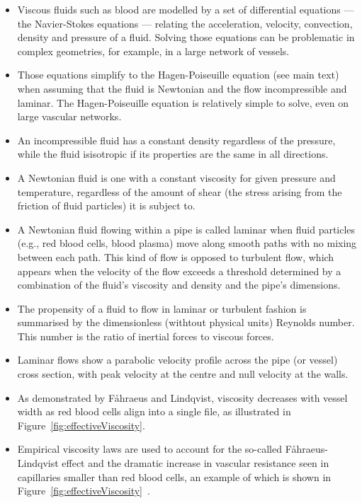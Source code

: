 \documentclass{article}
\begin{document}
\begin{tcolorbox}[title=Additional information -- Fluid flow modelling]
  \begin{itemize}
  \item Viscous fluids such as blood are modelled by a set of differential equations --- the Navier-Stokes equations --- relating the acceleration, velocity, convection, density and pressure of a fluid.
    Solving those equations can be problematic in complex geometries, for example, in a large network of vessels.
  \item Those equations simplify to the Hagen-Poiseuille equation (see main text) when assuming that the fluid is Newtonian and the flow incompressible and laminar.
    The Hagen-Poiseuille equation is relatively simple to solve, even on large vascular networks.
  \item An incompressible fluid has a constant density regardless of the pressure, while the fluid isisotropic if its properties are the same in all directions.
  \item A Newtonian fluid is one with a constant viscosity for given pressure and temperature, regardless of the amount of shear (the stress arising from the friction of fluid particles) it is subject to.
  \item A Newtonian fluid flowing within a pipe is called laminar when fluid particles (e.g., red blood cells, blood plasma) move along smooth paths with no mixing between each path.
    This kind of flow is opposed to turbulent flow, which appears when the velocity of the flow exceeds a threshold determined by a combination of the fluid's viscosity and density and the pipe's dimensions.
  \item The propensity of a fluid to flow in laminar or turbulent fashion is summarised by the dimensionless (withtout physical units) Reynolds number. This number is the ratio of inertial forces to viscous forces.
  \item Laminar flows show a parabolic velocity profile across the pipe (or vessel) cross section, with peak velocity at the centre and null velocity at the walls.
  \item As demonstrated by F\r ahraeus and Lindqvist, viscosity decreases with vessel width as red blood cells align into a single file, as illustrated in Figure~\ref{fig:effectiveViscosity}\cite{Faahraeus_1931}.
  \item Empirical viscosity laws are used to account for the so-called F\r ahraeus-Lindqvist effect and the dramatic increase in vascular resistance seen in capillaries smaller than red blood cells, an example of which is shown in Figure~\ref{fig:effectiveViscosity}~\cite{Haynes_1960,Pries_1990,Secomb_2013}.
  \end{itemize}
\end{tcolorbox}
\end{document}
